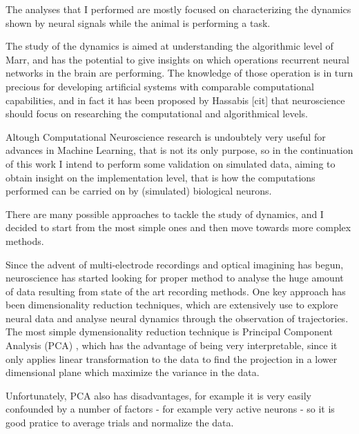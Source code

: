 The analyses that I performed are mostly focused on characterizing the dynamics shown by neural signals while the animal is performing a task. 

The study of the dynamics is aimed at understanding the algorithmic level of Marr, and has the potential to give insights on which operations recurrent neural networks in the brain are performing. The knowledge of those operation is in turn precious for developing artificial systems with comparable computational capabilities, and in fact it has been proposed by Hassabis [cit] that neuroscience should focus on researching the computational and algorithmical levels. 

Altough Computational Neuroscience research is undoubtely very useful for advances in Machine Learning, that is not its only purpose, so in the continuation of this work I intend to perform some validation on simulated data, aiming to obtain insight on the implementation level, that is how the computations performed can be carried on by (simulated) biological neurons.

There are many possible approaches to tackle the study of dynamics, and I decided to start from the most simple ones and then move towards more complex methods.

Since the advent of multi-electrode recordings and optical imagining has begun, neuroscience has started looking for proper method to analyse the huge amount of data resulting from state of the art recording methods.
One key approach has been dimensionality reduction techniques, which are extensively use to explore neural data and analyse neural dynamics through the observation of trajectories.
The most simple dymensionality reduction technique is Principal Component Analysis (PCA) , which has the advantage of being very interpretable, since it only applies linear transformation to the data to find the projection in a lower dimensional plane which maximize the variance in the data.

Unfortunately, PCA also has disadvantages, for example it is very easily confounded by a number of factors - for example very active neurons - so it is good pratice to average trials and normalize the data.

